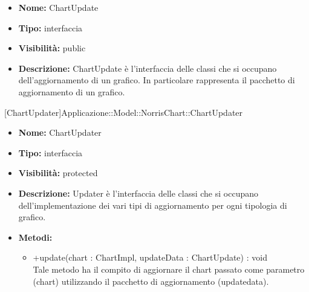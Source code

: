 			
			\begin{itemize}
			\item \textbf{Nome:} ChartUpdate
			\item \textbf{Tipo:} interfaccia
			
			\item \textbf{Visibilità:} public
			\item \textbf{Descrizione:} ChartUpdate è l'interfaccia delle classi che si occupano dell'aggiornamento di un grafico. In particolare rappresenta il pacchetto di aggiornamento di un grafico.
			\end{itemize}

			
			[ChartUpdater]{Applicazione::Model::NorrisChart::ChartUpdater}
			

	
			
			\begin{itemize}
			\item \textbf{Nome:} ChartUpdater
			\item \textbf{Tipo:} interfaccia
			
			\item \textbf{Visibilità:} protected
			\item \textbf{Descrizione:} Updater è l'interfaccia delle classi che si occupano dell'implementazione dei vari tipi di aggiornamento per ogni tipologia di grafico.
			\item \textbf{Metodi:}
				\begin{itemize}
				\setlength{\itemsep}{5pt}
				
					\item[\ding{111}] {{+update(chart : ChartImpl, updateData : ChartUpdate) : void}} \\ [1mm] Tale metodo ha il compito di aggiornare il chart passato come parametro (chart) utilizzando il pacchetto di aggiornamento (updatedata).
				\end{itemize}
		
			\end{itemize}

